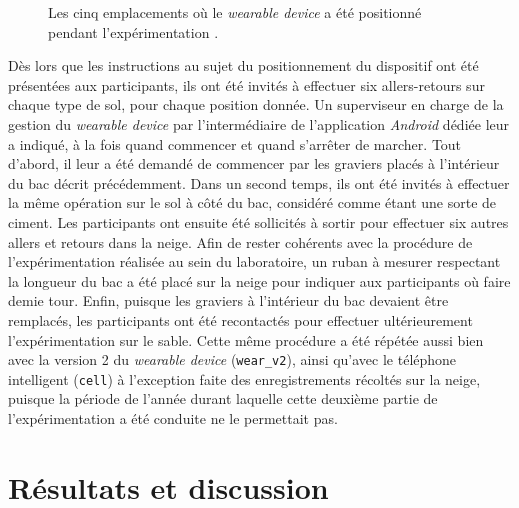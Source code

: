\begin{figure}[H]
	\centering
	\hspace*{\fill}
    \caption[Les cinq emplacements où le \textit{wearable device} a été positionné pendant l'expérimentation.]{Les cinq emplacements où le \textit{wearable device} a été positionné pendant l'expérimentation \citep{Thullier2017}.}
    \label{fig:positions}
\end{figure}

Dès lors que les instructions au sujet du positionnement du dispositif ont été présentées aux participants, ils ont été invités à effectuer six allers-retours sur chaque type de sol, pour chaque position donnée. Un superviseur en charge de la gestion du \textit{wearable device} par l'intermédiaire de l'application \textit{Android} dédiée leur a indiqué, à la fois quand commencer et quand s'arrêter de marcher. Tout d'abord, il leur a été demandé de commencer par les graviers placés à l'intérieur du bac décrit précédemment. Dans un second temps, ils ont été invités à effectuer la même opération sur le sol à côté du bac, considéré comme étant une sorte de ciment. Les participants ont ensuite été sollicités à sortir pour effectuer six autres allers et retours dans la neige. Afin de rester cohérents avec la procédure de l'expérimentation réalisée au sein du laboratoire, un ruban à mesurer respectant la longueur du bac a été placé sur la neige pour indiquer aux participants où faire demie tour. Enfin, puisque les graviers à l'intérieur du bac devaient être remplacés, les participants ont été recontactés pour effectuer ultérieurement l'expérimentation sur le sable. Cette même procédure a été répétée aussi bien avec la version 2 du \textit{wearable device} (\texttt{wear\_v2}), ainsi qu'avec le téléphone intelligent (\texttt{cell}) à l'exception faite des enregistrements récoltés sur la neige, puisque la période de l'année durant laquelle cette deuxième partie de l'expérimentation a été conduite ne le permettait pas.

\section{Résultats et discussion}

